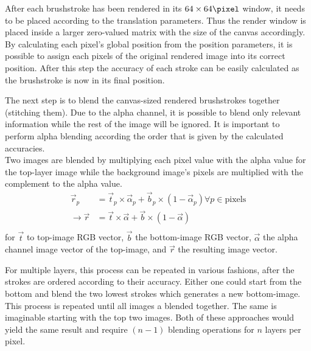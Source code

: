 After each brushstroke has been rendered in its $64\times64\si{\pixel}$ window, it needs to be placed according to the translation parameters.
Thus the render window is placed inside a larger zero-valued matrix with the size of the canvas accordingly.\\
By calculating each pixel's global position from the position parameters, it is possible to assign each pixels of the original rendered image into its correct position.
After this step the accuracy of each stroke can be easily calculated as the brushstroke is now in its final position.

The next step is to blend the canvas-sized rendered brushstrokes together (stitching them).
Due to the alpha channel, it is possible to blend only relevant information while the rest of the image will be ignored.
It is important to perform alpha blending according the order that is given by the calculated accuracies.\\
Two images are blended by multiplying each pixel value with the alpha value for the top-layer image while the background image's pixels are multiplied with the complement to the alpha value.
\begin{align}
    \vec{r}_p & = \vec{t}_p \times \vec{\alpha}_p + \vec{b}_p \times (1 - \vec{\alpha}_p) \forall p \in \text{pixels} \\
    \rightarrow \vec{r} & = \vec{t} \times \vec{\alpha} + \vec{b} \times (1 - \vec{\alpha}) \\
\end{align}
for $\vec{t}$ to top-image RGB vector, $\vec{b}$ the bottom-image RGB vector, $\vec{\alpha}$ the alpha channel image vector of the top-image, and $\vec{r}$ the resulting image vector.

For multiple layers, this process can be repeated in various fashions, after the strokes are ordered according to their accuracy.
Either one could start from the bottom and blend the two lowest strokes which generates a new bottom-image. 
This process is repeated until all images a blended together.
The same is imaginable starting with the top two images.
Both of these approaches would yield the same result and require $(n-1)$ blending operations for $n$ layers per pixel.

